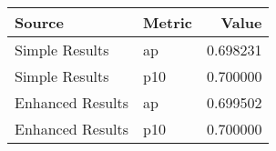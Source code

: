\begin{tabular}{llr}
\toprule
Source & Metric & Value \\
\midrule
Simple Results & ap & 0.698231 \\
Simple Results & p10 & 0.700000 \\
Enhanced Results & ap & 0.699502 \\
Enhanced Results & p10 & 0.700000 \\
\bottomrule
\end{tabular}
